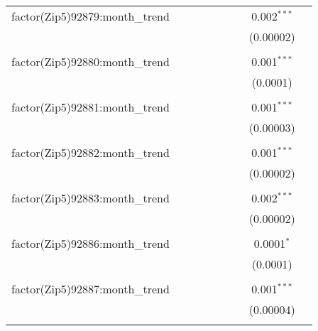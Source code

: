 \begin{table}[H]
{\begin{tabular}{@{\extracolsep{5pt}}lcccccccc}
  factor(Zip5)92879:month\_trend &  &  &  &  &  &  & 0.002$^{***}$ &  \\  

   &  &  &  &  &  &  & (0.00002) &  \\  

   & & & & & & & & \\  

  factor(Zip5)92880:month\_trend &  &  &  &  &  &  & 0.001$^{***}$ &  \\  

   &  &  &  &  &  &  & (0.0001) &  \\  

   & & & & & & & & \\  

  factor(Zip5)92881:month\_trend &  &  &  &  &  &  & 0.001$^{***}$ &  \\  

   &  &  &  &  &  &  & (0.00003) &  \\  

   & & & & & & & & \\  

  factor(Zip5)92882:month\_trend &  &  &  &  &  &  & 0.001$^{***}$ &  \\  

   &  &  &  &  &  &  & (0.00002) &  \\  

   & & & & & & & & \\  

  factor(Zip5)92883:month\_trend &  &  &  &  &  &  & 0.002$^{***}$ &  \\  

   &  &  &  &  &  &  & (0.00002) &  \\  

   & & & & & & & & \\  

  factor(Zip5)92886:month\_trend &  &  &  &  &  &  & 0.0001$^{*}$ &  \\  

   &  &  &  &  &  &  & (0.0001) &  \\  

   & & & & & & & & \\  

  factor(Zip5)92887:month\_trend &  &  &  &  &  &  & 0.001$^{***}$ &  \\  

   &  &  &  &  &  &  & (0.00004) &  \\  

   & & & & & & & & \\  


\end{tabular}}
\end{table}
